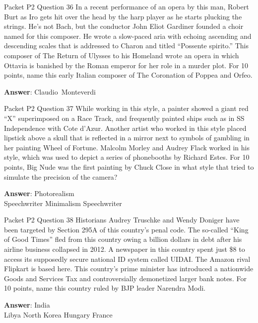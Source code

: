 \begin{frame}{Packet P2 Question 36}
In a recent performance of an opera by this man, Robert Burt as Iro gets hit over the head by the harp player as he starts plucking the strings. He's not Bach, but the conductor John Eliot Gardiner founded a choir named for this composer. He wrote a slow-paced aria with echoing ascending and descending scales that is addressed to Charon and titled ``Possente spirito.'' This composer   of The Return of Ulysses to his Homeland   wrote an opera in which Ottavia is banished   by the Roman emperor for her role in a murder plot. For   10 points, name this early Italian composer of The Coronation of Poppea and Orfeo.

\textbf{Answer}: Claudio\ Monteverdi\\
\end{frame}

\begin{frame}{Packet P2 Question 37}
While working in this   style, a painter showed a giant red ``X'' superimposed on a Race Track, and frequently painted ships such as in SS Independence with Cote d'Azur. Another artist who worked in this style placed lipstick above a skull that is reflected in a mirror next to symbols of gambling in her painting Wheel of Fortune. Malcolm Morley and Audrey Flack worked in his style, which was used to depict a series of phonebooths by Richard Estes. For 10 points, Big Nude was the first   painting by Chuck Close in what style   that tried to simulate the precision of the camera?    

\textbf{Answer}: Photorealism\\
 Speechwriter
 Minimalism
 Speechwriter
\end{frame}

\begin{frame}{Packet P2 Question 38}
Historians Audrey Truschke and Wendy Doniger have been targeted by Section 295A of this country's penal code. The so-called ``King of Good Times'' fled from this country owing a billion dollars in debt after his airline business collapsed in 2012. A newspaper in this country spent just \$8 to access its supposedly secure national ID system called UIDAI. The Amazon rival Flipkart is based here. This country's prime minister has introduced a nationwide Goods and Services Tax and controversially demonetized larger bank notes. For 10 points, name this country ruled by BJP leader Narendra Modi.        

\textbf{Answer}: India\\
 Libya
 North Korea
 Hungary
 France
\end{frame}

